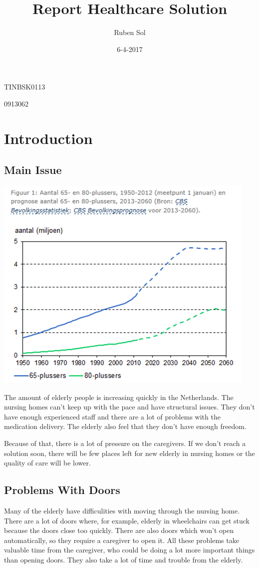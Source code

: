 \documentclass[14pt, a4paper]{extarticle}
\title{Report Healthcare Solution}
\date{6-4-2017}
\author{Ruben Sol}
\begin{document}
	\nocite{*}
	\maketitle
	TINBSK0113
	
	0913062
	
	\newpage
	\tableofcontents
	
	\newpage
	\section{Introduction}
	\subsection{Main Issue}
	
	\includegraphics[scale=0.75]{vergrijzing1}
	
	
	
	The amount of elderly people is increasing quickly in the Netherlands. \cite{bevolkingspiramide} The nursing homes can't keep up with the pace and have structural issues. They don't have enough experienced staff and there are a lot of problems with the medication delivery. The elderly also feel that they don't have enough freedom. \cite{structureleproblemen}	 
	
	Because of that, there is a lot of pressure on the caregivers. If we don't reach a solution soon, there will be few places left for new elderly in nursing homes or the quality of care will be lower.
	
	\subsection{Problems With Doors}
	Many of the elderly have difficulities with moving through the nursing home. There are a lot of doors where, for example, elderly in wheelchairs can get stuck because the doors close too quickly. There are also doors which won't open automatically, so they require a caregiver to open it. All these problems take valuable time from the caregiver, who could be doing a lot more important things than opening doors. They also take a lot of time and trouble from the elderly. 
	
\end{document}
